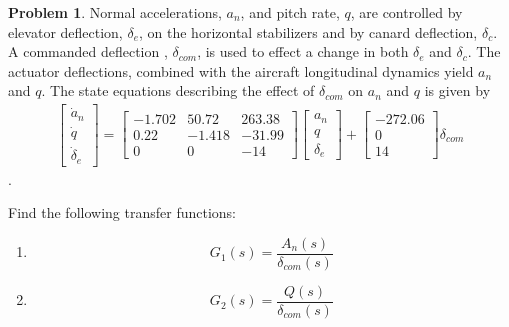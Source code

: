 \documentclass[10pt]{article}
\theoremstyle{definition}
\newtheorem{prob}{Problem}[section]
\newenvironment{subprob}%
{\renewcommand{\theenumi}{\alph{enumi}}\renewcommand{\labelenumi}{(\theenumi)}\begin{enumerate}}%
{\end{enumerate}}%
\begin{document}
\begin{prob}
     Normal accelerations, \( a_n \), and pitch rate, \( q \), are controlled by elevator deflection, \( \delta_e\), on the horizontal stabilizers and by canard deflection, \( \delta_c \).
    A commanded deflection , \( \delta_{com} \), is used to effect a change in both \( \delta_e \) and \( \delta_c\).
    The actuator deflections, combined with the aircraft longitudinal dynamics yield \( a_n \) and \( q\).
    The state equations describing the effect of \( \delta_{com} \) on \( a_n \) and \( q\) is given by
    \begin{align*}
        \begin{bmatrix} 
            \dot a_n \\ \dot q \\ \dot \delta_e 
        \end{bmatrix}
        = \begin{bmatrix}
            -1.702 & 50.72 & 263.38 \\
            0.22 & -1.418 & -31.99\\
            0 & 0 & -14
        \end{bmatrix}
        \begin{bmatrix}
            a_n \\ q \\ \delta_e
        \end{bmatrix}
        + 
        \begin{bmatrix}
            -272.06 \\ 0 \\14
        \end{bmatrix}
        \delta_{com}
    \end{align*} .

    \noindent Find the following transfer functions:
    \begin{subprob}
        \item
            \[
                G_1(s) = \frac{A_n(s)}{\delta_{com}(s)}
            \]
        \item 
            \[
                G_2(s) = \frac{Q(s)}{\delta_{com}(s)}
            \]
    \end{subprob}
\end{prob}
\end{document}
